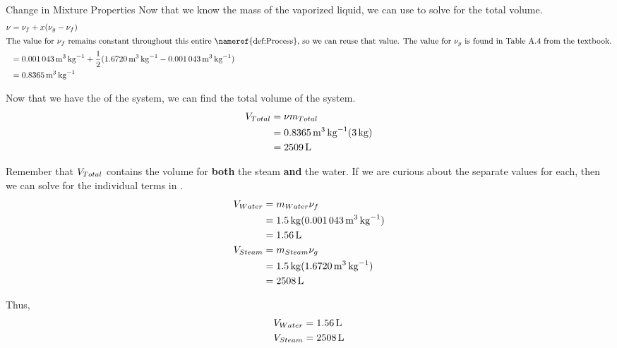 \begin{example}{Change in Mixture Properties}
  Now that we know the mass of the vaporized liquid, we can use  to solve for the total volume.
  \begin{align*}
    \SpecificVolume &= \SaturatedFluidVol + \Quality(\SaturatedVaporVol - \SaturatedFluidVol) \\
    \intertext{The value for $\SaturatedFluidVol$ remains constant throughout this entire \nameref{def:Process}, so we can reuse that value. The value for $\SaturatedVaporVol$ is found in Table A.4 from the textbook.}
                    &= \SI{0.001043}{\meter\cubed\per\kilo\gram} + \frac{1}{2} (\SI{1.6720}{\meter\cubed\per\kilo\gram} - \SI{0.001043}{\meter\cubed\per\kilo\gram}) \\
                    &= \SI{0.8365}{\meter\cubed\per\kilo\gram}
  \end{align*}

  Now that we have the  of the system, we can find the total volume of the system.
  \begin{align*}
    V_{Total} &= \nu m_{Total} \\
                    &= \SI{0.8365}{\meter\cubed\per\kilo\gram} (\SI{3}{\kilo\gram}) \\
                    &= \SI{2509}{\liter}
  \end{align*}

  Remember that $V_{Total}$ contains the volume for \textbf{both} the steam \textbf{and} the water.
  If we are curious about the separate values for each, then we can solve for the individual terms in .
  \begin{align*}
    V_{Water} &= m_{Water} \nu_{f} \\
                    &= \SI{1.5}{\kilo\gram} (\SI{0.001043}{\meter\cubed\per\kilo\gram}) \\
                    &= \SI{1.56}{\liter} \\
    V_{Steam} &= m_{Steam} \nu_{g} \\
                    &= \SI{1.5}{\kilo\gram} (\SI{1.6720}{\meter\cubed\per\kilo\gram}) \\
                    &= \SI{2508}{\liter}
  \end{align*}

  Thus,
  \begin{align*}
    V_{Water} &=  \SI{1.56}{\liter} \\
    V_{Steam} &= \SI{2508}{\liter}
  \end{align*}


\end{example}
